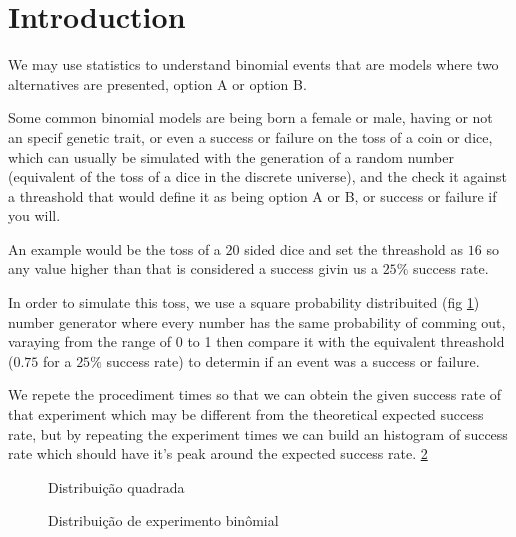 \section{Introduction}

We may use statistics to understand binomial events that are models where
two alternatives are presented, option A or option B.

Some common binomial models are being born a female or male, having or not an specif genetic trait,
or even a success or failure on the toss of a coin or dice, which can usually
be simulated with the generation of a random number (equivalent of the toss of a dice in the discrete universe),
and the check it against a threashold that would define it as being
option A or B, or success or failure if you will.

An example would be the toss of a $20$ sided dice and set the threashold as $16$ so any value higher
than that is considered a success givin us a $25\%$ success rate.

In order to simulate this toss, we use a square probability distribuited (fig \ref{intro:squared}) number generator
where every number has the same probability of comming out, varaying from the range of 0 to 1
then compare it with the equivalent threashold ($0.75$ for a $25\%$ success rate) to determin if an event was
a success or failure.

We repete the procediment \introexperimentsize{} times so that we can obtein the given success rate of that experiment
which may be different from the theoretical expected success rate, but by repeating the experiment
\introexperimentrepeats{} times we can build an histogram of success rate which should have it's peak around the
expected success rate.
\ref{intro:binomial}

\begin{center}
\begin{figure}[H]
\begin{center}
\caption{Distribui\c{c}\~ao quadrada}
\label{intro:squared}
\end{center}
\end{figure}
\end{center}

\begin{center}
\begin{figure}[H]
\begin{center}
\caption{Distribui\c{c}\~ao de experimento bin\^omial}
\label{intro:binomial}
\end{center}
\end{figure}
\end{center}
